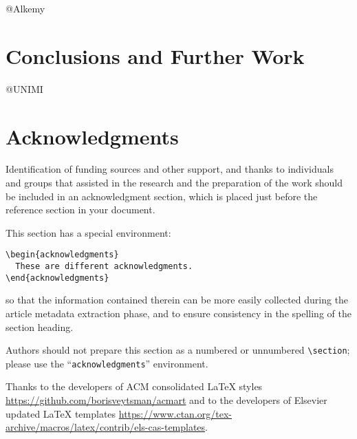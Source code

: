 \documentclass[
]{ceurart}
\begin{document}
@Alkemy


\section{Conclusions and Further Work}

@UNIMI

\section{Acknowledgments}

Identification of funding sources and other support, and thanks to
individuals and groups that assisted in the research and the
preparation of the work should be included in an acknowledgment
section, which is placed just before the reference section in your
document.

This section has a special environment:
\begin{lstlisting}
\begin{acknowledgments}
  These are different acknowledgments.
\end{acknowledgments}
\end{lstlisting}
so that the information contained therein can be more easily collected
during the article metadata extraction phase, and to ensure
consistency in the spelling of the section heading.

Authors should not prepare this section as a numbered or unnumbered
\verb|\section|; please use the ``\verb|acknowledgments|'' environment.


\begin{acknowledgments}
  Thanks to the developers of ACM consolidated LaTeX styles
  \url{https://github.com/borisveytsman/acmart} and to the developers
  of Elsevier updated \LaTeX{} templates
  \url{https://www.ctan.org/tex-archive/macros/latex/contrib/els-cas-templates}.  
\end{acknowledgments}



\appendix
\end{document}
